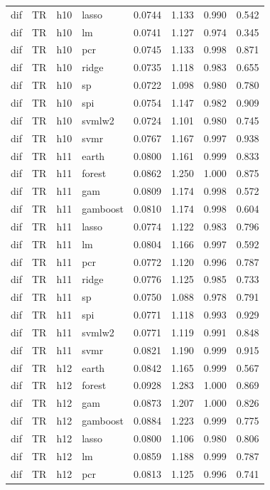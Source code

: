 \begin{ThreePartTable}
\begin{longtable}[t]{llclcccc}
dif & TR & h10 & lasso & 0.0744 & 1.133 & 0.990 & 0.542\\
dif & TR & h10 & lm & 0.0741 & 1.127 & 0.974 & 0.345\\
dif & TR & h10 & pcr & 0.0745 & 1.133 & 0.998 & 0.871\\
dif & TR & h10 & ridge & 0.0735 & 1.118 & 0.983 & 0.655\\
dif & TR & h10 & sp & 0.0722 & 1.098 & 0.980 & 0.780\\
dif & TR & h10 & spi & 0.0754 & 1.147 & 0.982 & 0.909\\
dif & TR & h10 & svmlw2 & 0.0724 & 1.101 & 0.980 & 0.745\\
dif & TR & h10 & svmr & 0.0767 & 1.167 & 0.997 & 0.938\\
\addlinespace
dif & TR & h11 & earth & 0.0800 & 1.161 & 0.999 & 0.833\\
dif & TR & h11 & forest & 0.0862 & 1.250 & 1.000 & 0.875\\
dif & TR & h11 & gam & 0.0809 & 1.174 & 0.998 & 0.572\\
dif & TR & h11 & gamboost & 0.0810 & 1.174 & 0.998 & 0.604\\
dif & TR & h11 & lasso & 0.0774 & 1.122 & 0.983 & 0.796\\
dif & TR & h11 & lm & 0.0804 & 1.166 & 0.997 & 0.592\\
dif & TR & h11 & pcr & 0.0772 & 1.120 & 0.996 & 0.787\\
dif & TR & h11 & ridge & 0.0776 & 1.125 & 0.985 & 0.733\\
dif & TR & h11 & sp & 0.0750 & 1.088 & 0.978 & 0.791\\
dif & TR & h11 & spi & 0.0771 & 1.118 & 0.993 & 0.929\\
dif & TR & h11 & svmlw2 & 0.0771 & 1.119 & 0.991 & 0.848\\
dif & TR & h11 & svmr & 0.0821 & 1.190 & 0.999 & 0.915\\
\addlinespace
dif & TR & h12 & earth & 0.0842 & 1.165 & 0.999 & 0.567\\
dif & TR & h12 & forest & 0.0928 & 1.283 & 1.000 & 0.869\\
dif & TR & h12 & gam & 0.0873 & 1.207 & 1.000 & 0.826\\
dif & TR & h12 & gamboost & 0.0884 & 1.223 & 0.999 & 0.775\\
dif & TR & h12 & lasso & 0.0800 & 1.106 & 0.980 & 0.806\\
dif & TR & h12 & lm & 0.0859 & 1.188 & 0.999 & 0.787\\
dif & TR & h12 & pcr & 0.0813 & 1.125 & 0.996 & 0.741\\

\end{longtable}
\end{ThreePartTable}
